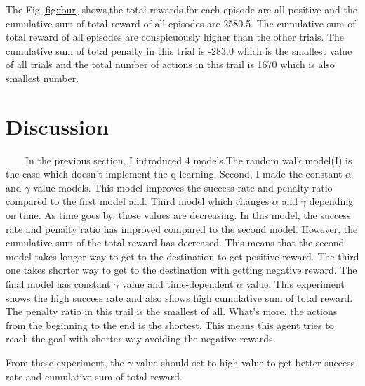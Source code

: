 \documentclass[a4paper,11pt]{article}
\begin{document}
The Fig.\ref{fig:four} shows,the total rewards for each episode are all positive and the cumulative sum of total reward of all episodes are 2580.5.
The cumulative sum of total reward of all episodes are conspicuously higher than the other trials. The cumulative sum of total penalty in this trial is -283.0 which is the smallest value of all trials and the total number of actions in this trail is 1670 which is also smallest number.

\section{Discussion}
\ \ \ \ In the previous section, I introduced 4 models.The random walk model(I) is the case which doesn't implement the q-learning.
Second, I made the constant $\alpha$ and $\gamma$ value models. This model improves the success rate and penalty ratio compared to the first model and. 
Third model which changes $\alpha$ and $\gamma$  depending on time. As time goes by, those values are decreasing. In this model, the success rate and penalty ratio has improved compared to the second model. However, the cumulative sum of the total reward has decreased. This means that the second model takes longer way to get to the destination to get positive reward. The third one takes shorter way to get to the destination with getting negative reward.
The final model has constant $\gamma$ value and time-dependent $\alpha$ value. This experiment shows the high success rate and also shows high cumulative sum of total reward. The penalty ratio in this trail is the smallest of all. What's more, the actions from the beginning to the end is the shortest.
This means this agent tries to reach the goal with shorter way avoiding the negative rewards.

From these experiment, the $\gamma$ value should set to high value to get better success rate and cumulative sum of total reward. 
\end{document}
